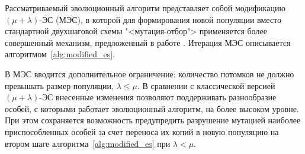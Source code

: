 \documentclass[12pt]{article}
\begin{document}
Рассматриваемый эволюционный алгоритм представляет собой модификацию 
$(\mu + \lambda)$-ЭС (МЭС), в которой для формирования новой популяции вместо 
стандартной двухшаговой схемы "<мутация-отбор"> применяется более совершенный 
механизм, предложенный в работе 
\cite[с.~62]{michalewicz98}.
Итерация МЭС описывается алгоритмом~\ref{alg:modified_es}.

В МЭС вводится дополнительное 
ограничение: количество потомков не должно превышать размер популяции, 
$\lambda \leq \mu$. В сравнении с классической версией $(\mu + \lambda)$-ЭС 
внесенные изменения позволяют поддерживать разнообразие особей, с которыми 
работает эволюционный алгоритм, на более высоком уровне. При этом сохраняется 
возможность предупредить разрушение мутацией наиболее приспособленных особей 
за счет переноса их копий в новую популяцию на втором шаге 
алгоритма~\ref{alg:modified_es}
при $\lambda<\mu$.
\end{document}
